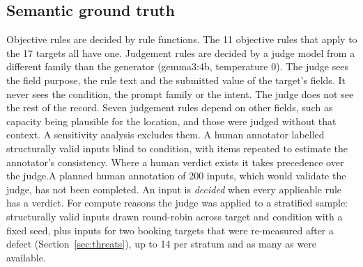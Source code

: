 \documentclass[conference]{IEEEtran}
\begin{document}
\subsection{Semantic ground truth}
Objective rules are decided by rule functions. The 11 objective rules that apply to the 17 targets all
have one. Judgement rules are decided by a judge model from a different family than the generator
(gemma3:4b, temperature 0). The judge sees the field purpose, the rule text and the submitted value of
the target's fields. It never sees the condition, the prompt family or the intent. The judge does not see the rest of the record. Seven judgement rules depend on other fields, such as
capacity being plausible for the location, and those were judged without that context. A sensitivity
analysis excludes them. \ifhumanlabels A human annotator labelled  structurally valid inputs blind to
condition, with  items repeated to estimate the annotator's consistency. Where a human
verdict exists it takes precedence over the judge.\else A planned human annotation of 200 inputs, which
would validate the judge, has not been completed.\fi{} An input is \emph{decided} when every applicable
rule has a verdict. For compute reasons the judge was applied to a stratified sample: 
structurally valid inputs drawn round-robin across target and condition with a fixed seed, plus
 inputs for two booking targets that were re-measured after a defect
(Section~\ref{sec:threats}), up to 14 per stratum and as many as were available.
\end{document}
